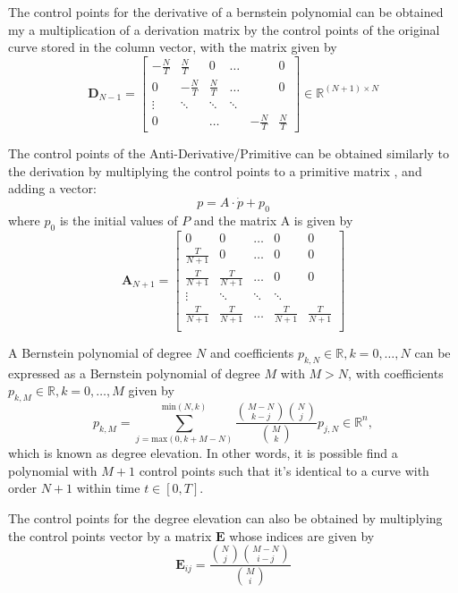 \par The control points for the derivative of a bernstein polynomial can be obtained my a multiplication of a derivation matrix by the control points of the original curve stored in the column vector, with the matrix given by 
\begin{equation}
    \boldsymbol{D}_{N-1} = 
    \begin{bmatrix}
        -\frac{N}{T} & \frac{N}{T} & 0 & \ldots & & 0 \\
        0 & -\frac{N}{T} & \frac{N}{T} & \ldots & & 0 \\
        \vdots &  \ddots & \ddots & \ddots & &   \\
        0 & & \ldots & & -\frac{N}{T} & \frac{N}{T}
    \end{bmatrix} \in \mathbb{R}^{(N+1)\times N}
    \label{eq:bernderivmat}
\end{equation}

\par The control points of the Anti-Derivative/Primitive can be obtained similarly to the derivation by multiplying the control points to a primitive matrix \cite{privateconversationprimitive}, and adding a vector:
\begin{equation}
    p = A \cdot \dot{p}  + p_0
\end{equation}
where $p_0$ is the initial values of $P$ and the matrix A is given by 
\begin{equation}
    \boldsymbol{A}_{N+1} = \begin{bmatrix}
        0 & 0 & \ldots & 0 & 0 \\
        \frac{T}{N+1} & 0 & \ldots & 0 & 0 \\
        \frac{T}{N+1} & \frac{T}{N+1} & \ldots & 0 & 0 \\
        \vdots & \ddots & \ddots & \ddots & \\
        \frac{T}{N+1} & \frac{T}{N+1} & \ldots & \frac{T}{N+1} & \frac{T}{N+1} \\
    \end{bmatrix}
\end{equation}

\par A Bernstein polynomial of degree $N$ and coefficients $p_{k,N}\in \mathbb{R}, k = 0,\dots,N$ can be expressed as a Bernstein polynomial of degree $M$ with $M>N$, with coefficients $p_{k,M} \in \mathbb{R}, k = 0,\dots,M$ given by 
\begin{equation}
    p_{k,M} = \sum_{j=\text{max}(0,k+M-N)}^{\text{min}(N,k)} \frac{{M-N \choose k-j}{N\choose j}}{{M\choose k}} p_{j,N} \in \mathbb{R}^n,
\end{equation}
which is known as degree elevation. In other words, it is possible find a polynomial with $M+1$ control points such that it's identical to a curve with order $N+1$ within time $t\in[0,T]$.
\par The control points for the degree elevation can also be obtained by multiplying the control points vector by a matrix $\boldsymbol{E}$ whose indices are given by 
\begin{equation}
    \label{eq:bernsteinelevindices}
    \boldsymbol{E}_{ij} = \frac{{N\choose j}{M-N\choose i-j}}{{M\choose i}}
\end{equation}


